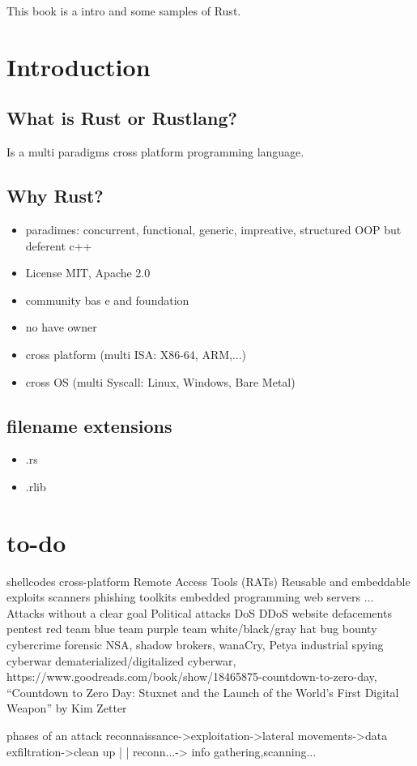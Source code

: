 \documentclass{book}
\begin{document}
	This book is a intro and some samples of Rust.
	\chapter{Introduction}
	\section{What is Rust or Rustlang?}
	Is a multi paradigms cross platform programming language.
	\section{Why Rust?}
	\begin{itemize}
		\item paradimes: concurrent, functional, generic, impreative, structured OOP but deferent c++
		\item License 	MIT, Apache 2.0
		\item  community bas	e and foundation
		\item no have owner
		\item cross platform (multi ISA: X86-64, ARM,...)
		\item cross OS (multi Syscall: Linux, Windows, Bare Metal)
\end{itemize}
	\section{filename extensions}
	\begin{itemize}
			\item .rs 
		\item .rlib
	\end{itemize}
\chapter{to-do}
shellcodes
cross-platform Remote Access Tools (RATs)
Reusable and embeddable exploits
scanners
phishing toolkits
embedded programming
web servers
...
Attacks without a clear goal
 Political attacks
 DoS
 DDoS
  website defacements
  pentest
  red team
  blue team
  purple team
  white/black/gray hat
  bug bounty
  cybercrime
  forensic
  NSA, shadow brokers, wanaCry, Petya
  industrial spying
  cyberwar
  dematerialized/digitalized
  cyberwar, https://www.goodreads.com/book/show/18465875-countdown-to-zero-day, “Countdown to Zero Day: Stuxnet and the Launch of the World’s First
  Digital Weapon” by Kim Zetter
  
  phases of an attack
  reconnaissance->exploitation->lateral movements->data exfiltration->clean up
  										|				|
reconn...-> info gathering,scanning...
  										
\end{document}
